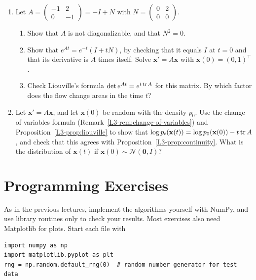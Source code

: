 \begin{enumerate}[leftmargin=*]
\begin{enumerate}[label=(\alph*)]
        \item Let $A$ be skew-symmetric. Show that $Q(t) = e^{At}$ is orthogonal for all $t$, by differentiating $Q(t)^\top Q(t)$. Show that Euler's method for $\mathbf{x}' = A\mathbf{x}$ increases $\norm{\mathbf{x}_k}$ in every step (unless $A\mathbf{x}_k = \mathbf{0}$).
    \end{enumerate}
    \item\label{L3-ex3:nilpotent} Let $A = \begin{pmatrix} -1 & 2 \\ 0 & -1 \end{pmatrix} = -I + N$ with $N = \begin{pmatrix} 0 & 2 \\ 0 & 0 \end{pmatrix}$.
    \begin{enumerate}[label=(\alph*)]
        \item Show that $A$ is not diagonalizable, and that $N^2 = 0$.
        \item Show that $e^{At} = e^{-t}(I + tN)$, by checking that it equals $I$ at $t = 0$ and that its derivative is $A$ times itself. Solve $\mathbf{x}' = A\mathbf{x}$ with $\mathbf{x}(0) = (0, 1)^\top$.
        \item Check Liouville's formula $\det e^{At} = e^{t\operatorname{tr} A}$ for this matrix. By which factor does the flow change areas in the time $t$?
    \end{enumerate}
    \item Let $\mathbf{x}' = A\mathbf{x}$, and let $\mathbf{x}(0)$ be random with the density $p_0$. Use the change of variables formula (Remark~\ref{L3-rem:change-of-variables}) and Proposition~\ref{L3-prop:liouville} to show that $\log p_t(\mathbf{x}(t)) = \log p_0(\mathbf{x}(0)) - t\operatorname{tr} A$, and check that this agrees with Proposition~\ref{L3-prop:continuity}. What is the distribution of $\mathbf{x}(t)$ if $\mathbf{x}(0) \sim \mathcal{N}(\mathbf{0}, I)$?
\end{enumerate}

\section{Programming Exercises}\label{L3-sec:programming}

\setlength{\emergencystretch}{3em}

As in the previous lectures, implement the algorithms yourself with NumPy, and use library routines only to check your results. Most exercises also need Matplotlib for plots. Start each file with
\begin{lstlisting}
import numpy as np
import matplotlib.pyplot as plt
rng = np.random.default_rng(0)  # random number generator for test data
\end{lstlisting}

